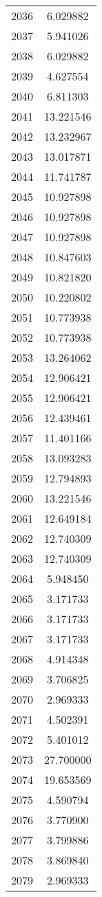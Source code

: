 \documentclass[12pt]{article}
\begin{document}
\begin{longtable}{@{}cc@{}}
2036 & 6.029882 \\
2037 & 5.941026 \\
2038 & 6.029882 \\
2039 & 4.627554 \\
2040 & 6.811303 \\
2041 & 13.221546 \\
2042 & 13.232967 \\
2043 & 13.017871 \\
2044 & 11.741787 \\
2045 & 10.927898 \\
2046 & 10.927898 \\
2047 & 10.927898 \\
2048 & 10.847603 \\
2049 & 10.821820 \\
2050 & 10.220802 \\
2051 & 10.773938 \\
2052 & 10.773938 \\
2053 & 13.264062 \\
2054 & 12.906421 \\
2055 & 12.906421 \\
2056 & 12.439461 \\
2057 & 11.401166 \\
2058 & 13.093283 \\
2059 & 12.794893 \\
2060 & 13.221546 \\
2061 & 12.649184 \\
2062 & 12.740309 \\
2063 & 12.740309 \\
2064 & 5.948450 \\
2065 & 3.171733 \\
2066 & 3.171733 \\
2067 & 3.171733 \\
2068 & 4.914348 \\
2069 & 3.706825 \\
2070 & 2.969333 \\
2071 & 4.502391 \\
2072 & 5.401012 \\
2073 & 27.700000 \\
2074 & 19.653569 \\
2075 & 4.590794 \\
2076 & 3.770900 \\
2077 & 3.799886 \\
2078 & 3.869840 \\
2079 & 2.969333 \\

\end{longtable}
\end{document}
